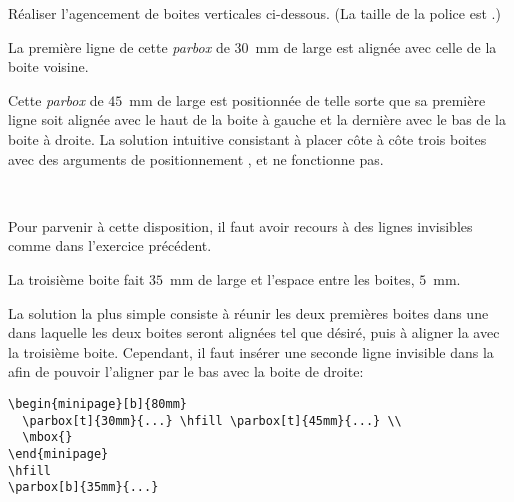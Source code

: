 \begin{exercice}
  Réaliser l'agencement de boites verticales ci-dessous. (La taille de
  la police est .)
  \begin{center}
    \begin{minipage}{120mm}
      \footnotesize
      \begin{minipage}[b]{80mm}
        \parbox[t]{30mm}{La première ligne de cette \emph{parbox} de
          $30$~mm de large est alignée avec celle de la boite
          voisine.}
        \hfill
        \parbox[t]{45mm}{Cette \emph{parbox} de $45$~mm de large est
          positionnée de telle sorte que sa première ligne soit
          alignée avec le haut de la boite à gauche et la dernière
          avec le bas de la boite à droite. La solution intuitive
          consistant à placer côte à côte trois boites avec des
          arguments de positionnement ,  et 
          ne fonctionne pas.} \\
        \mbox{}
      \end{minipage}
      \hfill
      \parbox[b]{35mm}{Pour parvenir à cette disposition, il faut
        avoir recours à des lignes invisibles comme dans l'exercice
        précédent.}
    \end{minipage}
  \end{center}
  La troisième boite fait $35$~mm de large et l'espace entre les
  boites, $5$~mm.
  \begin{sol}
    La solution la plus simple consiste à réunir les deux premières
    boites dans une  dans laquelle les deux boites seront
    alignées tel que désiré, puis à aligner la  avec la
    troisième boite. Cependant, il faut insérer une seconde ligne
    invisible dans la  afin de pouvoir l'aligner par le
    bas avec la boite de droite:
\begin{lstlisting}
\begin{minipage}[b]{80mm}
  \parbox[t]{30mm}{...} \hfill \parbox[t]{45mm}{...} \\
  \mbox{}
\end{minipage}
\hfill
\parbox[b]{35mm}{...}
\end{lstlisting}
  \end{sol}
\end{exercice}


